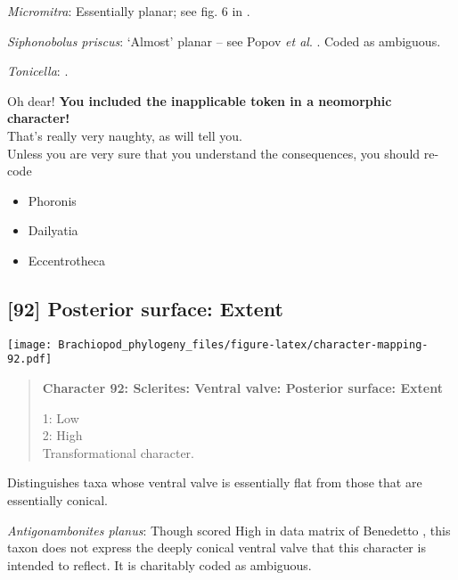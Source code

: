 \documentclass[openany]{book}
\providecommand{\tightlist}{%
  \setlength{\itemsep}{0pt}\setlength{\parskip}{0pt}}
\theoremstyle{definition}
\theoremstyle{definition}
\theoremstyle{definition}
\theoremstyle{remark}
\begin{document}
\hypertarget{Micromitra-coding-91}{}
\emph{Micromitra}: Essentially planar; see fig. 6 in
\citet{Ushatinskaya2016Protegulumand}.

\hypertarget{Siphonobolus_priscus-coding-91}{}
\emph{Siphonobolus priscus}: `Almost' planar -- see Popov \emph{et al}.
\citeyearpar[fig. 4]{Popov2009Earlyontogeny}. Coded as ambiguous.

\hypertarget{Tonicella-coding-91}{}
\emph{Tonicella}: \citep{Schwabe2010}.

Oh dear! \textbf{You included the inapplicable token in a neomorphic
character!}\\
That's really very naughty, as \citet{Brazeau2018} will tell you.\\
Unless you are very sure that you understand the consequences, you
should re-code

\begin{itemize}
\tightlist
\item
  Phoronis\\
\item
  Dailyatia\\
\item
  Eccentrotheca
\end{itemize}

\subsection*{{[}92{]} Posterior surface:
Extent}\label{posterior-surface-extent}

\texttt{[image: Brachiopod\_phylogeny\_files/figure-latex/character-mapping-92.pdf]}

\begin{quote}
\textbf{Character 92: Sclerites: Ventral valve: Posterior surface:
Extent}

1: Low\\
2: High\\
Transformational character.
\end{quote}

Distinguishes taxa whose ventral valve is essentially flat from those
that are essentially conical.

\hypertarget{Antigonambonites_planus-coding-92}{}
\emph{Antigonambonites planus}: Though scored High in data matrix of
Benedetto \citeyearpar{Benedetto2009iChaniella}, this taxon
\citep[see][fig. 508]{Williams2000LinguliformeaCraniiformea} does not
express the deeply conical ventral valve that this character is intended
to reflect. It is charitably coded as ambiguous.
\end{document}
